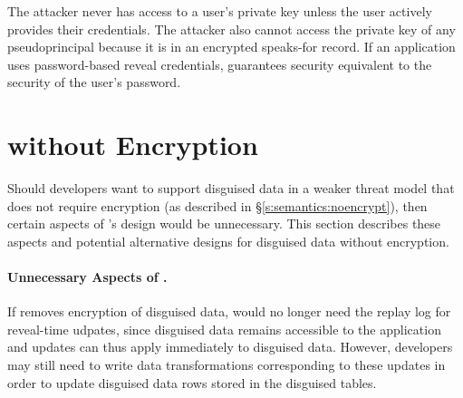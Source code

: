%
%
The attacker never has access to a user's private key unless the user actively
provides their credentials.
%
The attacker also cannot access the private key of any pseudoprincipal because
it is in an encrypted speaks-for record.
%
%
If an application uses password-based reveal credentials, \sys
guarantees security equivalent to the security of the user's password.

\section{\sys without Encryption}
\label{s:noencrypt}

%

Should developers want to support disguised data in a weaker threat model that
does not require encryption (as described in \S\ref{s:semantics:noencrypt}),
then certain aspects of \sys's design would be unnecessary. This section
describes these aspects and potential
alternative designs for disguised data without encryption. 

\paragraph{Unnecessary Aspects of \sys.}
If \sys removes encryption of disguised data, \sys would no longer need the
replay log for reveal-time udpates, since disguised data remains accessible to
the application and updates can thus apply immediately to disguised data.
However, developers may still need to write data transformations corresponding
to these updates in order to update disguised data rows stored in the disguised
tables.
%

